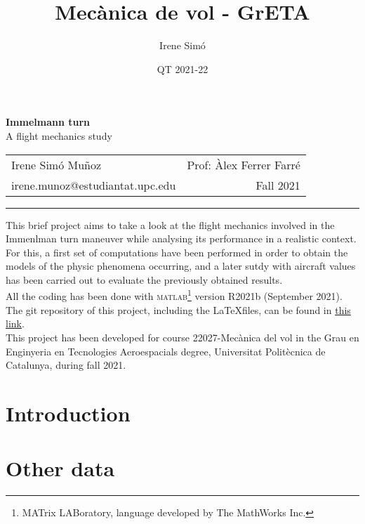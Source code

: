 \documentclass[10pt, twoside]{report}
\title{Mecànica de vol - GrETA}
\author{Irene Simó}
\date{QT 2021-22}
\begin{document}
\thispagestyle{empty} 
	\begin{center}
	\LARGE \textbf{Immelmann turn}\\
	\Large A flight mechanics study\\
		\normalsize
	\begin{tabularx}{\textwidth}{l r}
		Irene Simó Muñoz & Prof: Àlex Ferrer Farré\\
		irene.munoz@estudiantat.upc.edu & Fall 2021
	\end{tabularx}

	\hrule
	\end{center}
	This brief project aims to take a look at the flight mechanics involved in the Immenlman turn maneuver while analysing its performance in a realistic context. \\ For this, a first set of computations have been performed in order to obtain the models of the physic phenomena occurring, and a later sutdy with aircraft values has been carried out to evaluate the previously obtained results.\\
	All the coding has been done with \textsc{matlab}\footnote{MATrix LABoratory, language developed by The MathWorks Inc.} version R2021b (September 2021). The git repository of this project, including the \LaTeX files, can be found in \hyperlink{https://github.com/isimo00/immelmann-turn}{this link}.\\
	This project has been developed for course 22027-Mecànica del vol in the Grau en Enginyeria en Tecnologies Aeroespacials degree, Universitat Politècnica de Catalunya, during fall 2021.
	
	\begin{multicols}{2}
	\vspace*{-2cm}
	\tableofcontents
	\section*{Introduction}
	
		
	

	
	\section*{Other data}
	\end{multicols}\clearpage
\listoffigures
\listoftables
\end{document}
